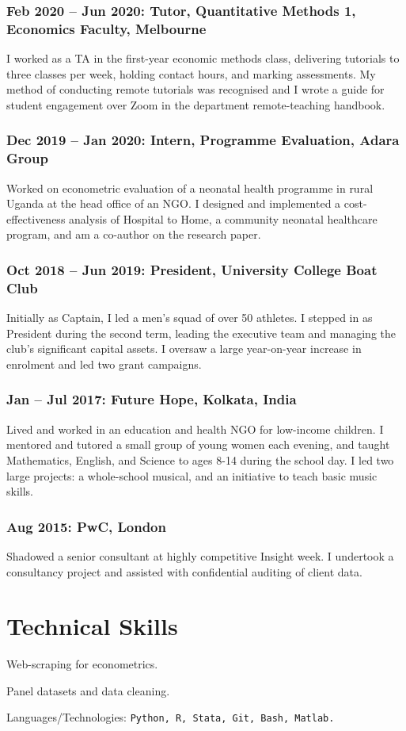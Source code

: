 \documentclass[a4]{article}
\renewenvironment{itemize}{
  \begin{list}{}{
    \setlength{\leftmargin}{1.5em}
  }
}{
  \end{list}
}
\begin{document}
\subsubsection*{Feb 2020 -- Jun 2020: Tutor, Quantitative Methods 1, Economics Faculty, Melbourne}
I worked as a TA in the first-year economic methods class, delivering tutorials to three classes per week, holding contact hours, and marking assessments. My method of conducting remote tutorials was recognised and I wrote a guide for student engagement over Zoom in the department remote-teaching handbook.

\subsubsection*{Dec 2019 -- Jan 2020: Intern, Programme Evaluation, Adara Group}
Worked on econometric evaluation of a neonatal health programme in rural Uganda at the head office of an NGO. I designed and implemented a cost-effectiveness analysis of Hospital to Home, a community neonatal healthcare program, and am a co-author on the research paper.
\subsubsection*{Oct 2018 -- Jun 2019: President, University College Boat Club}
Initially as Captain, I led a men’s squad of over 50 athletes. I stepped in as President during the second term, leading the executive team and managing the club’s significant capital assets. I oversaw a large year-on-year increase in enrolment and led two grant campaigns.
\subsubsection*{Jan -- Jul 2017: Future Hope, Kolkata, India}
Lived and worked in an education and health NGO for low-income children. I mentored and tutored a small group of young women each evening, and taught Mathematics, English, and Science to ages 8-14 during the school day. I led two large projects: a whole-school musical, and an initiative to teach basic music skills. 
\subsubsection*{Aug 2015: PwC, London}
Shadowed a senior consultant at highly competitive Insight week. I undertook a consultancy project and assisted with confidential auditing of client data.

\section*{Technical Skills}
\begin{itemize}
	\item Web-scraping for econometrics.
	\item Panel datasets and data cleaning.
	\item Languages/Technologies: \tt Python, R, Stata, Git, Bash, Matlab.
\end{itemize}
\end{document}
